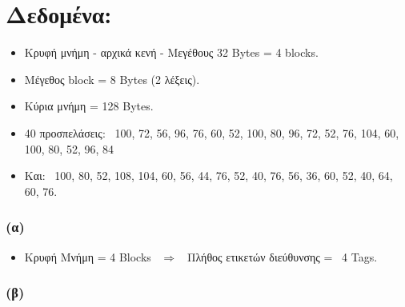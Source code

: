 \documentclass{article}
\begin{document}
\section*{\textbf{Δεδομένα:}}
\begin{itemize}
    \item {Κρυφή μνήμη - αρχικά κενή - Μεγέθους} 32 \textlatin{Bytes = 4 blocks}.
    \item {Μέγεθος} \textlatin{block} = 8 \textlatin{Bytes} (2 λέξεις).
    \item {Κύρια μνήμη} = 128 \textlatin{Bytes}.
    \item {40 προσπελάσεις}: \ 100, 72, 56, 96, 76, 60, 52, 100, 80, 96, 72, 52, 76, 104, 60, 100, 80, 52, 96, 84
    \item {Και}: \ 100, 80, 52, 108, 104, 60, 56, 44, 76, 52, 40, 76, 56, 36, 60, 52, 40, 64, 60, 76.
\end{itemize}

\subsubsection*{\textbf{(α)}}

\begin{itemize}
    \item Κρυφή Μνήμη = 4 \textlatin{Blocks} \ $\Rightarrow$ \ {Πλήθος ετικετών διεύθυνσης} = \ 4 \textlatin{Tags}. 
\end{itemize}

\subsubsection*{\textbf{(β)}}
\end{document}
